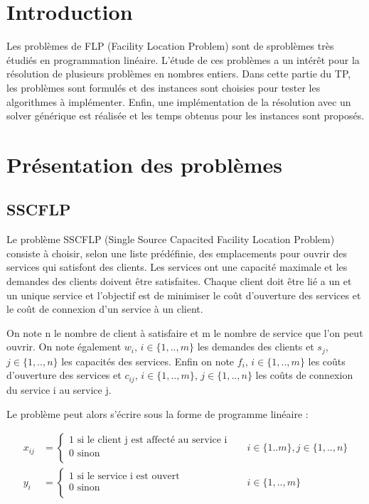 \section{Introduction}

Les problèmes de FLP (Facility Location Problem) sont de sproblèmes très étudiés en programmation linéaire.
L'étude de ces problèmes a un intérêt pour la résolution de plusieurs problèmes en nombres entiers.
Dans cette partie du TP, les problèmes sont formulés et des instances sont choisies pour tester les algorithmes à implémenter.
Enfin, une implémentation de la résolution avec un solver générique est réalisée et les temps obtenus pour les instances sont proposés.

\section{Présentation des problèmes}

\subsection{SSCFLP}

Le problème SSCFLP (Single Source Capacited Facility Location Problem) consiste à choisir, selon une liste prédéfinie, des emplacements pour ouvrir des services qui satisfont des clients. Les services ont une capacité maximale et les demandes des clients doivent être satisfaites. Chaque client doit être lié a un et un unique service et l'objectif est de minimiser le coût d'ouverture des services et le coût de connexion d'un service à un client. \newline

On note n le nombre de client à satisfaire et m le nombre de service que l'on peut ouvrir.
On note également $w_i$, $i \in \{1,..,m\}$ les demandes des clients et $s_j$, $j \in \{1,..,n\}$ les capacités des services.
Enfin on note $f_i$, $i \in \{1,..,m\}$ les coûts d'ouverture des services et $c_{ij}$, $i \in \{1,..,m\}$, $j \in \{1,..,n\}$ les coûts de connexion du service i au service j. \newline

Le problème peut alors s'écrire sous la forme de programme linéaire :

\begin{align*}
x_{ij} &= \begin{cases}
        1 \text{ si le client j est affecté au service i}\\
        0 \text{ sinon} \\
    \end{cases}
&&i \in \{1..m\}, j \in \{1,..,n\} \\
y_i &= \begin{cases}
        1 \text{ si le service i est ouvert}\\
        0 \text{ sinon} \\
    \end{cases}
&&i \in \{1,..,m\}
\end{align*}




